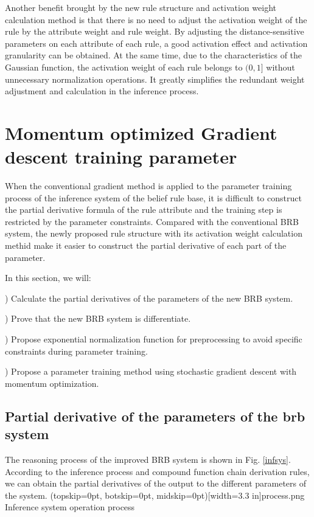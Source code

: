 \documentclass{ieeeaccess}
\begin{document}
Another benefit brought by the new rule structure and activation weight calculation method is that
there is no need to adjust the activation weight of the rule by the attribute weight and rule weight.
By adjusting the distance-sensitive parameters on each attribute of each rule, a good activation effect and activation granularity can be obtained.
At the same time, due to the characteristics of the Gaussian function, the activation weight of each rule belongs to $(0, 1]$ without unnecessary normalization operations.
It greatly simplifies the redundant weight adjustment and calculation in the inference process.


\section{Momentum optimized Gradient descent training parameter}
When the conventional gradient method is applied to the parameter training process of the inference system of the belief rule base,
it is difficult to construct the partial derivative formula of the rule attribute and the training step is restricted by the parameter constraints.
Compared with the conventional BRB system, the newly proposed rule structure with its activation weight calculation methid make it easier to construct the partial derivative of each part of the parameter.

In this section, we will:

) Calculate the partial derivatives of the parameters of the new BRB system.

) Prove that the new BRB system is differentiate.

) Propose exponential normalization function for preprocessing to avoid specific constraints during parameter training.

) Propose a parameter training method using stochastic gradient descent with momentum optimization.


\subsection{Partial derivative of the parameters of the brb system}
The reasoning process of the improved BRB system is shown in Fig. \ref{infsys}.
According to the inference process and compound function chain derivation rules, we can obtain the partial derivatives of the output to the different parameters of the system.
\Figure[!t](topskip=0pt, botskip=0pt, midskip=0pt)[width=3.3 in]{process.png}
{Inference system operation process\label{infsys}}
\end{document}
